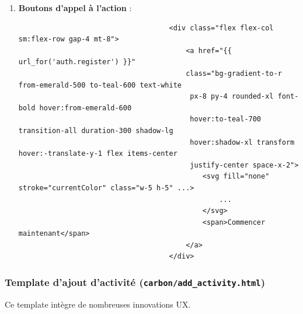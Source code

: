 \documentclass[a4paper,11pt]{article}
\begin{document}
\begin{enumerate}
                        \item \textbf{Boutons d'appel à l'action} :
                            \begin{tcolorbox}[colback=lightgray!6, colframe=black, left=-70mm, right=5mm, top=2mm, bottom=0mm, boxrule=0.1mm]
                                \begin{verbatim}
                                    <div class="flex flex-col sm:flex-row gap-4 mt-8">
                                        <a href="{{ url_for('auth.register') }}" 
                                        class="bg-gradient-to-r from-emerald-500 to-teal-600 text-white
                                         px-8 py-4 rounded-xl font-bold hover:from-emerald-600 
                                         hover:to-teal-700 transition-all duration-300 shadow-lg 
                                         hover:shadow-xl transform hover:-translate-y-1 flex items-center 
                                         justify-center space-x-2">
                                            <svg fill="none" stroke="currentColor" class="w-5 h-5" ...>
                                                ...
                                            </svg>
                                            <span>Commencer maintenant</span>
                                        </a>
                                    </div>
                                \end{verbatim}
                            \end{tcolorbox}
                    \end{enumerate}

                \subsubsection{Template d'ajout d'activité (\texttt{carbon/add\_activity.html})}
                    \noindent Ce template intègre de nombreuses innovations UX.
\end{document}

